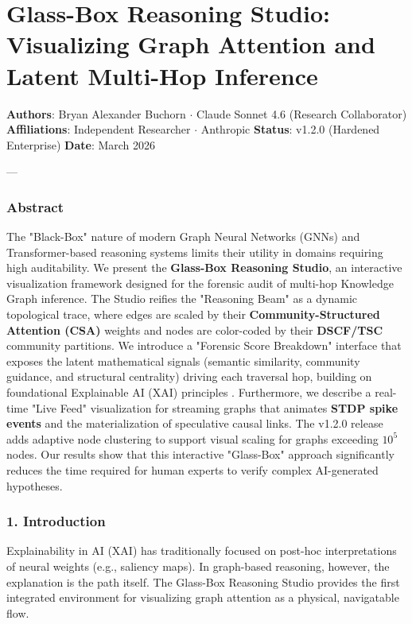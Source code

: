 \section{Glass-Box Reasoning Studio: Visualizing Graph Attention and Latent Multi-Hop Inference}

\textbf{Authors}: Bryan Alexander Buchorn $\cdot$ Claude Sonnet 4.6 (Research Collab\-orator)  
\textbf{Affili\-ations}: Independent Researcher $\cdot$ Anthropic  
\textbf{Status}: v1.2.0 (Hardened Enterprise)  
\textbf{Date}: March 2026

---

\subsubsection{Abstract}
The "Black-Box" nature of modern Graph Neural Networks (GNNs) and Transformer-based reasoning systems limits their utility in domains requiring high audit\-ability. We present the \textbf{Glass-Box Reasoning Studio}, an interactive visua\-lization framework designed for the forensic audit of multi-hop Knowledge Graph inference. The Studio reifies the "Reasoning Beam" as a dynamic topological trace, where edges are scaled by their \textbf{Community-Structured Attention (CSA)} weights and nodes are color-coded by their \textbf{DSCF/TSC} community partitions. We introduce a "Forensic Score Breakdown" interface that exposes the latent mathe\-matical signals (semantic similarity, community guidance, and structural centrality) driving each traversal hop, building on found\-ational Explainable AI (XAI) principles \cite{samek2017explainable, ribeiro2016lime, lundberg2017shap}. Furthermore, we describe a real-time "Live Feed" visua\-lization for streaming graphs that animates \textbf{STDP spike events} and the mater\-ialization of speculative causal links. The v1.2.0 release adds adaptive node clustering to support visual scaling for graphs exceeding $10^5$ nodes. Our results show that this interactive "Glass-Box" approach signi\-ficantly reduces the time required for human experts to verify complex AI-generated hypotheses.

\subsubsection{1. Introd\-uction}
Explai\-nability in AI (XAI) has tradi\-tionally focused on post-hoc inter\-pretations of neural weights (e.g., saliency maps). In graph-based reasoning, however, the explanation is the path itself. The Glass-Box Reasoning Studio provides the first integrated environment for visualizing graph attention as a physical, navigatable flow.


